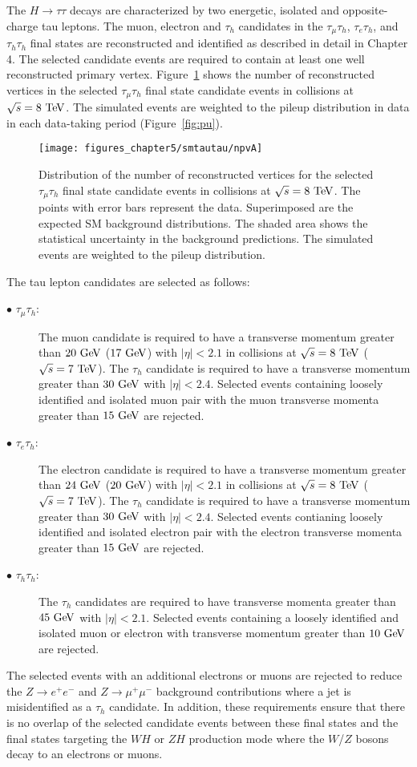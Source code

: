 The $H \rightarrow \tau\tau$ decays are characterized by two energetic, isolated and opposite-charge tau leptons. The muon, electron and $\tau_h$ candidates in the  $\tau_{\mu}\tau_{h}$, $\tau_{e}\tau_{h}$, and $\tau_{h}\tau_{h}$  final states are reconstructed and identified as described in detail in Chapter 4.  The selected candidate events are required to contain at least one well reconstructed primary vertex. Figure~\ref{fig:npv} shows the number of reconstructed vertices in the selected $\tau_{\mu}\tau_{h}$ final state candidate events in collisions at $\sqrt{s}=8~\mathrm{Te\kern -0.1em V}$. The simulated events are weighted to the pileup distribution in data in each data-taking period (Figure~\ref{fig:pu}). 
\begin{figure}[htbp]
\centering
\texttt{[image: figures\_chapter5/smtautau/npvA]}
\caption{Distribution of the number of reconstructed vertices for the selected $\tau_{\mu}\tau_{h}$ final state candidate events in collisions at $\sqrt{s}=8~\mathrm{Te\kern -0.1em V}$. The points with error bars represent the data. Superimposed are the expected SM background distributions. The shaded area shows the statistical uncertainty in the background predictions. The simulated events are weighted to the pileup distribution.}
\label{fig:npv}
\end{figure}
The tau lepton candidates are selected as follows:
\begin{description}
\item[$\bullet$ $\tau_{\mu}\tau_h$:] The muon candidate is required to have a transverse momentum greater than  $20~\mathrm{Ge\kern -0.1em V}$ ($17~\mathrm{Ge\kern -0.1em V}$) with $|\eta|<2.1$ in collisions at $\sqrt{s}=8~\mathrm{Te\kern -0.1em V}$ ($\sqrt{s}=7~\mathrm{Te\kern -0.1em V}$). The $\tau_h$ candidate is required to have a transverse momentum greater than $30~\mathrm{Ge\kern -0.1em V}$ with $|\eta|<2.4$. Selected events containing loosely identified and isolated muon pair with the muon transverse momenta greater than $15~\mathrm{Ge\kern -0.1em V}$ are rejected. 
\item[$\bullet$ $\tau_{e}\tau_h$:] The electron candidate is required to have a transverse momentum greater than  $24~\mathrm{Ge\kern -0.1em V}$ ($20~\mathrm{Ge\kern -0.1em V}$) with $|\eta|<2.1$ in collisions at $\sqrt{s}=8~\mathrm{Te\kern -0.1em V}$ ($\sqrt{s}=7~\mathrm{Te\kern -0.1em V}$). The $\tau_h$ candidate is required to have a transverse momentum greater than $30~\mathrm{Ge\kern -0.1em V}$ with $|\eta|<2.4$. Selected events contianing loosely identified and isolated electron pair with the electron transverse momenta greater than $15~\mathrm{Ge\kern -0.1em V}$ are rejected. 
\item[$\bullet$ $\tau_{h}\tau_h$:] The $\tau_h$ candidates are required to have transverse momenta greater than $45~\mathrm{Ge\kern -0.1em V}$ with $|\eta|<2.1$. Selected events containing a loosely identified and isolated muon or electron with transverse momentum greater than $10~\mathrm{Ge\kern -0.1em V}$ are rejected. 
\end{description}    
The selected events with an additional electrons or muons are rejected to reduce the $Z \rightarrow e^+e^-$ and $Z \rightarrow \mu^+\mu^-$ background contributions where a jet is misidentified as a $\tau_h$ candidate. In addition, these requirements ensure that there is no overlap of the selected candidate events between these final states and the final states targeting the $WH$ or $ZH$ production mode where the $W$/$Z$ bosons decay to an electrons or muons.   


